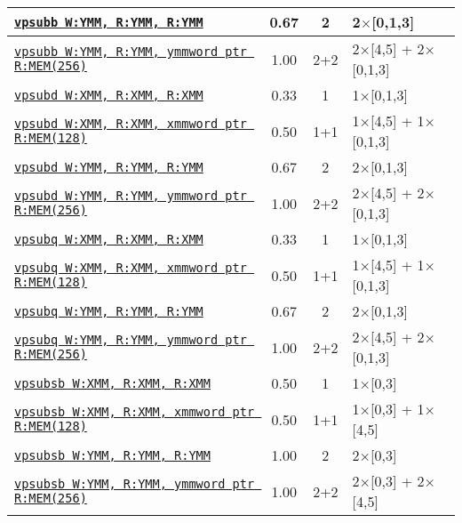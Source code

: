 \documentclass[a4paper,english,fontsize=9]{scrartcl}
\begin{document}
\begin{longtable}{p{}ccL{.25\textwidth}}
  \midrule
  \texttt{\href{https://felixcloutier.com/x86/PSUBB:PSUBW:PSUBD.html}{vpsubb W:YMM, R:YMM, R:YMM}} & 0.67 & 2 & 2\(\times\)[0,1,3] \\
  \midrule
  \texttt{\href{https://felixcloutier.com/x86/PSUBB:PSUBW:PSUBD.html}{vpsubb W:YMM, R:YMM, ymmword ptr R:MEM(256)}} & 1.00 & 2+2 & 2\(\times\)[4,5] + 2\(\times\)[0,1,3] \\
  \midrule
  \texttt{\href{https://felixcloutier.com/x86/PSUBB:PSUBW:PSUBD.html}{vpsubd W:XMM, R:XMM, R:XMM}} & 0.33 & 1 & 1\(\times\)[0,1,3] \\
  \midrule
  \texttt{\href{https://felixcloutier.com/x86/PSUBB:PSUBW:PSUBD.html}{vpsubd W:XMM, R:XMM, xmmword ptr R:MEM(128)}} & 0.50 & 1+1 & 1\(\times\)[4,5] + 1\(\times\)[0,1,3] \\
  \midrule
  \texttt{\href{https://felixcloutier.com/x86/PSUBB:PSUBW:PSUBD.html}{vpsubd W:YMM, R:YMM, R:YMM}} & 0.67 & 2 & 2\(\times\)[0,1,3] \\
  \midrule
  \texttt{\href{https://felixcloutier.com/x86/PSUBB:PSUBW:PSUBD.html}{vpsubd W:YMM, R:YMM, ymmword ptr R:MEM(256)}} & 1.00 & 2+2 & 2\(\times\)[4,5] + 2\(\times\)[0,1,3] \\
  \midrule
  \texttt{\href{https://felixcloutier.com/x86/PSUBQ.html}{vpsubq W:XMM, R:XMM, R:XMM}} & 0.33 & 1 & 1\(\times\)[0,1,3] \\
  \midrule
  \texttt{\href{https://felixcloutier.com/x86/PSUBQ.html}{vpsubq W:XMM, R:XMM, xmmword ptr R:MEM(128)}} & 0.50 & 1+1 & 1\(\times\)[4,5] + 1\(\times\)[0,1,3] \\
  \midrule
  \texttt{\href{https://felixcloutier.com/x86/PSUBQ.html}{vpsubq W:YMM, R:YMM, R:YMM}} & 0.67 & 2 & 2\(\times\)[0,1,3] \\
  \midrule
  \texttt{\href{https://felixcloutier.com/x86/PSUBQ.html}{vpsubq W:YMM, R:YMM, ymmword ptr R:MEM(256)}} & 1.00 & 2+2 & 2\(\times\)[4,5] + 2\(\times\)[0,1,3] \\
  \midrule
  \texttt{\href{https://felixcloutier.com/x86/PSUBSB:PSUBSW.html}{vpsubsb W:XMM, R:XMM, R:XMM}} & 0.50 & 1 & 1\(\times\)[0,3] \\
  \midrule
  \texttt{\href{https://felixcloutier.com/x86/PSUBSB:PSUBSW.html}{vpsubsb W:XMM, R:XMM, xmmword ptr R:MEM(128)}} & 0.50 & 1+1 & 1\(\times\)[0,3] + 1\(\times\)[4,5] \\
  \midrule
  \texttt{\href{https://felixcloutier.com/x86/PSUBSB:PSUBSW.html}{vpsubsb W:YMM, R:YMM, R:YMM}} & 1.00 & 2 & 2\(\times\)[0,3] \\
  \midrule
  \texttt{\href{https://felixcloutier.com/x86/PSUBSB:PSUBSW.html}{vpsubsb W:YMM, R:YMM, ymmword ptr R:MEM(256)}} & 1.00 & 2+2 & 2\(\times\)[0,3] + 2\(\times\)[4,5] \\

\end{longtable}
\end{document}
